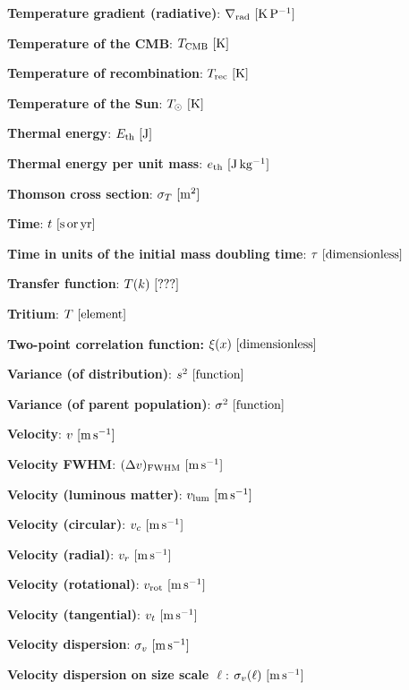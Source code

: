 \documentclass[a4paper,10pt]{article}
\begin{document}
{\noindent}\textbf{Temperature gradient (radiative)}: $\nabla_{\rm rad} ~ [{\rm K\,P^{-1}}]$

{\noindent}\textbf{Temperature of the CMB}: $T_{\rm CMB} ~ [{\rm K}]$

{\noindent}\textbf{Temperature of recombination}: $T_{\rm rec} ~ [{\rm K}]$

{\noindent}\textbf{Temperature of the Sun}: $T_\odot ~ [{\rm K}]$

{\noindent}\textbf{Thermal energy}: $E_\mathrm{th} ~ [{\rm J}]$

{\noindent}\textbf{Thermal energy per unit mass}: $e_\mathrm{th} ~ [{\rm J\,kg^{-1}}]$

{\noindent}\textbf{Thomson cross section}: $\sigma_T ~ [{\rm m^2}]$

{\noindent}\textbf{Time}: $t ~ [{\rm s\,or\,yr}]$

{\noindent}\textbf{Time in units of the initial mass doubling time}: $\tau ~ [{\rm dimensionless}]$

{\noindent}\textbf{Transfer function}: $T(k) ~ [{\rm ???}]$

{\noindent}\textbf{Tritium}: $T ~ [{\rm element}]$

{\noindent}\textbf{Two-point correlation function:} $\xi(x) ~ [{\rm dimensionless}]$

{\noindent}\textbf{Variance (of distribution)}: $s^2 ~ [{\rm function}]$

{\noindent}\textbf{Variance (of parent population)}: $\sigma^2 ~ [{\rm function}]$

{\noindent}\textbf{Velocity}: $v ~ [{\rm m\,s^{-1}}]$

{\noindent}\textbf{Velocity FWHM}: $(\Delta v)_{\rm FWHM} ~ [{\rm m\,s^{-1}}]$

{\noindent}\textbf{Velocity (luminous matter)}: $v_{\rm lum} ~ [{\rm m\,s^{-1}}]$

{\noindent}\textbf{Velocity (circular)}: $v_c ~ [{\rm m\,s^{-1}}]$

{\noindent}\textbf{Velocity (radial)}: $v_r ~ [{\rm m\,s^{-1}}]$

{\noindent}\textbf{Velocity (rotational)}: $v_\mathrm{rot} ~ [{\rm m\,s^{-1}}]$

{\noindent}\textbf{Velocity (tangential)}: $v_t ~ [{\rm m\,s^{-1}}]$

{\noindent}\textbf{Velocity dispersion}: $\sigma_v ~ [{\rm m\,s^{-1}}]$

{\noindent}\textbf{Velocity dispersion on size scale $\ell$}: $\sigma_v(\ell) ~ [{\rm m\,s^{-1}}]$
\end{document}
